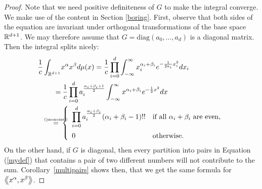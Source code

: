 \begin{proof} Note that we need positive definiteness of $G$ to make the integral converge. We make use of the content in Section \ref{boring}.
First, observe that both sides of the equation are invariant under orthogonal transformations of the base space $\mathbb{R}^{d+1}$. We may therefore assume that $G= \text{diag}\left(a_0,\ldots,a_d\right)$ is a diagonal matrix. Then the integral splits nicely:
\begin{align*}
\frac{1}{c}\int_{\R^{d+1}}& x^\alpha x^\beta d\mu(x)= \frac{1}{c}\prod_{i=0}^d \int_{-\infty}^\infty x_i^{\alpha_i+\beta_i} e^{-\frac{1}{2a_i}x_i^2}dx_i \\=&\: 
\frac{1}{c}\prod_{i=0}^d a_i^{\frac{\alpha_i+\beta_i+1}{2}}\int_{-\infty}^\infty x^{\alpha_i+\beta_i} e^{-\frac{1}{2}x^2}dx\\
\myeq{(\ref{monoint})}\  &\left\{
\begin{array}{*2{l}p{5cm}}\displaystyle \prod_{i=0}^d a_i^{\frac{\alpha_i+\beta_i}{2}}(\alpha_i+\beta_i-1)!! &\text{if all }\alpha_i+\beta_i\text{ are even}, \vspace{0.2cm} \\ 
 0 &\text{otherwise}.
\end{array}
 \right.
\end{align*}
On the other hand, if $G$ is diagonal, then every partition into pairs in Equation (\ref{mydef}) that contains a pair of two different numbers will not contribute to the sum. Corollary~\ref{multipairs} shows then, that we get the same formula for $\left<\!\!\!\:\left< x^\alpha ,x^\beta\right>\!\!\!\:\right>$.
\end{proof}

